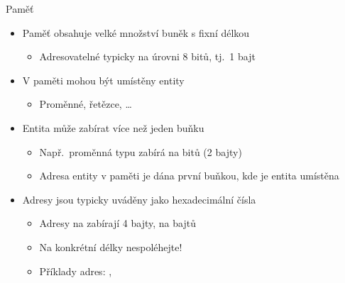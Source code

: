\begin{frame}{Paměť}

  \begin{itemize}
    \item Paměť obsahuje velké množství buněk s fixní délkou
    \begin{itemize}
      \item Adresovatelné typicky na úrovni 8 bitů, tj.\ 1 bajt
    \end{itemize}

    \pause

    \item V paměti mohou být umístěny entity
    \begin{itemize}
      \item Proměnné, řetězce, \dots
    \end{itemize}

    \pause

    \item Entita může zabírat více než jeden buňku
    \begin{itemize}
      \item Např.\ proměnná typu  zabírá na  bitů (2 bajty)
      \item Adresa entity v paměti je dána první buňkou, kde je entita
        umístěna
    \end{itemize}

    \pause

    \item Adresy jsou typicky uváděny jako hexadecimální čísla
    \begin{itemize}
      \item Adresy na \xesl zabírají 4 bajty, na  bajtů
      \item Na konkrétní délky nespoléhejte!
      \item Příklady adres: , 
    \end{itemize}

  \end{itemize}

\end{frame}



